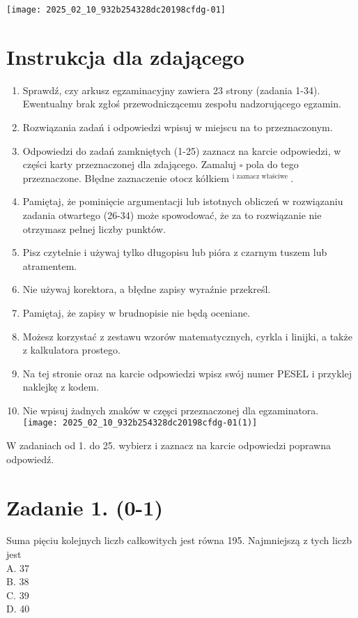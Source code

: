 \documentclass[10pt]{article}
\author{DATA: 23 sierpnia 2016 r.\\
Godzina rozpoczęcia: 9:00\\
Czas pracy: 170 minut\\
LicZba punktów do uzyskania: 50}
\date{}
\begin{document}
\maketitle
\begin{center}
\texttt{[image: 2025\_02\_10\_932b254328dc20198cfdg-01]}
\end{center}



\section*{Instrukcja dla zdającego}
\begin{enumerate}
  \item Sprawdź, czy arkusz egzaminacyjny zawiera 23 strony (zadania 1-34). Ewentualny brak zgłoś przewodniczącemu zespołu nadzorującego egzamin.
  \item Rozwiązania zadań i odpowiedzi wpisuj w miejscu na to przeznaczonym.
  \item Odpowiedzi do zadań zamkniętych (1-25) zaznacz na karcie odpowiedzi, w części karty przeznaczonej dla zdającego. Zamaluj \(\square\) pola do tego przeznaczone. Błędne zaznaczenie otocz kółkiem \({ }^{\text {i zaznacz właściwe }}\).
  \item Pamiętaj, że pominięcie argumentacji lub istotnych obliczeń w rozwiązaniu zadania otwartego (26-34) może spowodować, że za to rozwiązanie nie otrzymasz pełnej liczby punktów.
  \item Pisz czytelnie i używaj tylko długopisu lub pióra z czarnym tuszem lub atramentem.
  \item Nie używaj korektora, a błędne zapisy wyraźnie przekreśl.
  \item Pamiętaj, że zapisy w brudnopisie nie będą oceniane.
  \item Możesz korzystać z zestawu wzorów matematycznych, cyrkla i linijki, a także z kalkulatora prostego.
  \item Na tej stronie oraz na karcie odpowiedzi wpisz swój numer PESEL i przyklej naklejkę z kodem.
  \item Nie wpisuj żadnych znaków w częşci przeznaczonej dla egzaminatora.\\
\texttt{[image: 2025\_02\_10\_932b254328dc20198cfdg-01(1)]}
\end{enumerate}

W zadaniach od 1. do 25. wybierz i zaznacz na karcie odpowiedzi poprawna odpowiedź.

\section*{Zadanie 1. (0-1)}
Suma pięciu kolejnych liczb całkowitych jest równa 195. Najmniejszą z tych liczb jest\\
A. 37\\
B. 38\\
C. 39\\
D. 40
\end{document}
